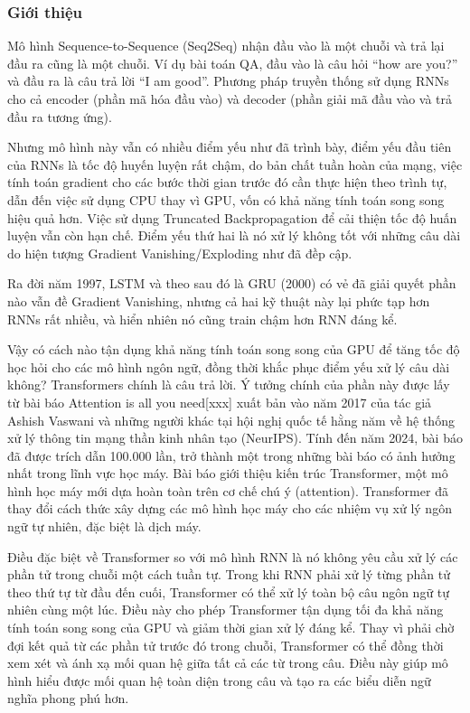 \subsubsection{Giới thiệu}
Mô hình Sequence-to-Sequence (Seq2Seq) nhận đầu vào là một chuỗi và trả lại đầu ra cũng là một chuỗi. Ví dụ bài toán QA, đầu vào là câu hỏi ``how are you?'' và đầu ra là câu trả lời ``I am good''. Phương pháp truyền thống sử dụng RNNs cho cả encoder (phần mã hóa đầu vào) và decoder (phần giải mã đầu vào và trả đầu ra tương ứng).

Nhưng mô hình này vẫn có nhiều điểm yếu như đã trình bày, điểm yếu đầu tiên của RNNs là tốc độ huyến luyện rất chậm, do bản chất tuần hoàn của mạng, việc tính toán gradient cho các bước thời gian trước đó cần thực hiện theo trình tự, dẫn đến việc sử dụng CPU thay vì GPU, vốn có khả năng tính toán song song hiệu quả hơn. Việc sử dụng Truncated Backpropagation để cải thiện tốc độ huấn luyện vẫn còn hạn chế. Điểm yếu thứ hai là nó xử lý không tốt với những câu dài do hiện tượng Gradient Vanishing/Exploding như đã đềp cập.

Ra đời năm 1997, LSTM và theo sau đó là GRU (2000) có vẻ đã giải quyết phần nào vẫn đề Gradient Vanishing, nhưng cả hai kỹ thuật này lại phức tạp hơn RNNs rất nhiều, và hiển nhiên nó cũng train chậm hơn RNN đáng kể.

Vậy có cách nào tận dụng khả năng tính toán song song của GPU để tăng tốc độ học hỏi cho các mô hình ngôn ngữ, đồng thời khắc phục điểm yếu xử lý câu dài không? Transformers chính là câu trả lời. Ý tưởng chính của phần này được lấy từ bài báo Attention is all you need[xxx] xuất bản vào năm 2017 của tác giả Ashish Vaswani và những người khác tại hội nghị quốc tế hằng năm về hệ thống xử lý thông tin mạng thần kinh nhân tạo (NeurIPS). Tính đến năm 2024, bài báo đã được trích dẫn 100.000 lần, trở thành một trong những bài báo có ảnh hưởng nhất trong lĩnh vực học máy. Bài báo giới thiệu kiến trúc Transformer, một mô hình học máy mới dựa hoàn toàn trên cơ chế chú ý (attention). Transformer đã thay đổi cách thức xây dựng các mô hình học máy cho các nhiệm vụ xử lý ngôn ngữ tự nhiên, đặc biệt là dịch máy.

Điều đặc biệt về Transformer so với mô hình RNN là nó không yêu cầu xử lý các phần tử trong chuỗi một cách tuần tự. Trong khi RNN phải xử lý từng phần tử theo thứ tự từ đầu đến cuối, Transformer có thể xử lý toàn bộ câu ngôn ngữ tự nhiên cùng một lúc. Điều này cho phép Transformer tận dụng tối đa khả năng tính toán song song của GPU và giảm thời gian xử lý đáng kể. Thay vì phải chờ đợi kết quả từ các phần tử trước đó trong chuỗi, Transformer có thể đồng thời xem xét và ánh xạ mối quan hệ giữa tất cả các từ trong câu. Điều này giúp mô hình hiểu được mối quan hệ toàn diện trong câu và tạo ra các biểu diễn ngữ nghĩa phong phú hơn.

